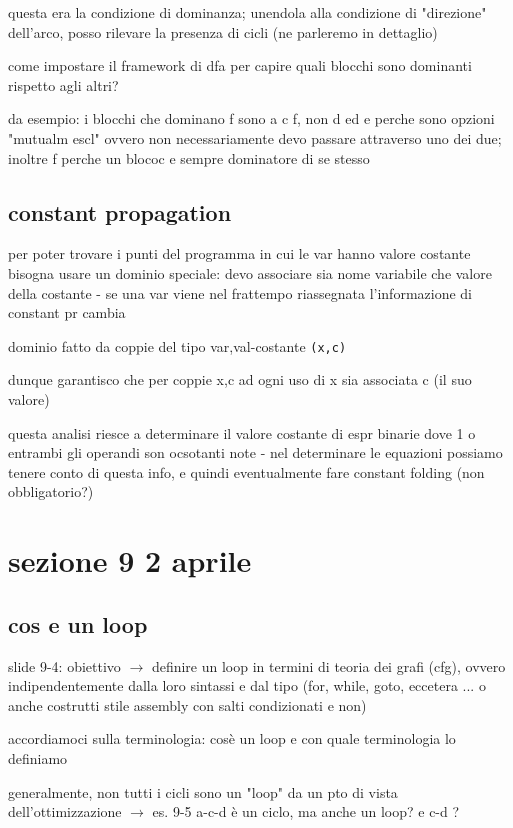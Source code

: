 questa era la condizione di dominanza; unendola alla condizione di "direzione" dell'arco, posso rilevare la presenza di cicli (ne parleremo in dettaglio)

come impostare il framework di dfa per capire quali blocchi sono dominanti rispetto agli altri?

da esempio: i blocchi che dominano f sono a c f, non d ed e perche sono opzioni "mutualm escl" ovvero non necessariamente devo passare attraverso uno dei due; inoltre f perche un blococ e sempre dominatore di se stesso

\subsection{constant propagation}

per poter trovare i punti del programma in cui le var hanno valore costante bisogna usare un dominio speciale: devo associare sia nome variabile che valore della costante - se una var viene nel frattempo riassegnata l'informazione di constant pr cambia

dominio fatto da coppie del tipo var,val-costante \lstinline|(x,c)|

dunque garantisco che per coppie x,c ad ogni uso di x sia associata c (il suo valore)

questa analisi riesce a determinare il valore costante di espr binarie dove 1 o entrambi gli operandi son ocsotanti note - nel determinare le equazioni possiamo tenere conto di questa info, e quindi eventualmente fare constant folding (non obbligatorio?)

\section{sezione 9 2 aprile}

\subsection{cos e un loop}

slide 9-4: obiettivo $\rightarrow$ definire un loop in termini di teoria dei grafi (cfg), ovvero indipendentemente dalla loro sintassi e dal tipo (for, while, goto, eccetera ... o anche costrutti stile assembly con salti condizionati e non)

accordiamoci sulla terminologia: cos\`e un loop e con quale terminologia lo definiamo

generalmente, non tutti i cicli sono un "loop" da un pto di vista dell'ottimizzazione $\rightarrow$ es. 9-5 a-c-d \`e un ciclo, ma anche un loop? e c-d ?

